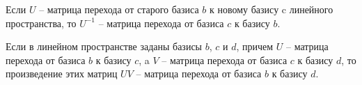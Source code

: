 \begin{property}[3]
  Если $U$ -- матрица перехода от старого базиса $b$ к новому базису c линейного пространства, то $U^{−1}$ -- матрица перехода от базиса $c$ к базису $b$.
\end{property}

\begin{property}[4]
  Если в линейном пространстве заданы базисы $b$, $c$ и $d$, причем $U$ -- матрица перехода от базиса $b$ к базису $c$, a $V$ -- матрица перехода от базиса $c$ к базису $d$, то произведение этих матриц $UV$ -- матрица перехода от базиса $b$ к базису $d$.
\end{property}

